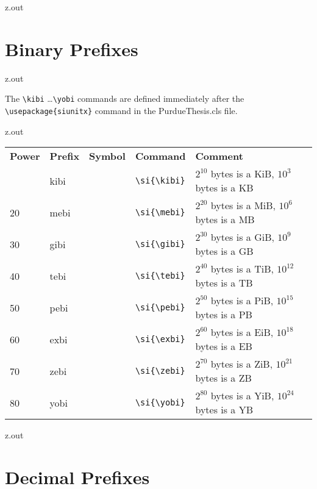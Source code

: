 \MyIO


\begin{VerbatimOut}{z.out}

\section{Binary Prefixes}
\end{VerbatimOut}

\MyIO


\begin{VerbatimOut}{z.out}

The \verb+\kibi+ \ldots \verb+\yobi+
commands are defined immediately after the \verb+\usepackage{siunitx}+ command
in the PurdueThesis.cls file.
\end{VerbatimOut}

\MyIO


\begin{VerbatimOut}{z.out}

\renewcommand{\t}[4]{\(2^{#1}\) bytes is a #2, \(10^{#3}\) bytes is a #4}
\begin{tabular}{@{}mllll@{}}
  \multicolumn{1}{l}{\bfseries Power}&
    \bfseries Prefix&
    \bfseries Symbol&
    \bfseries Command&
    \bfseries Comment\\
  \tabularspace
  10& kibi& \si{\kibi}& \verb+\si{\kibi}+& \t{10}{KiB}{3}{KB}\\
  20& mebi& \si{\mebi}& \verb+\si{\mebi}+& \t{20}{MiB}{6}{MB}\\
  30& gibi& \si{\gibi}& \verb+\si{\gibi}+& \t{30}{GiB}{9}{GB}\\
  40& tebi& \si{\tebi}& \verb+\si{\tebi}+& \t{40}{TiB}{12}{TB}\\
  50& pebi& \si{\pebi}& \verb+\si{\pebi}+& \t{50}{PiB}{15}{PB}\\
  60& exbi& \si{\exbi}& \verb+\si{\exbi}+& \t{60}{EiB}{18}{EB}\\
  70& zebi& \si{\zebi}& \verb+\si{\zebi}+& \t{70}{ZiB}{21}{ZB}\\
  80& yobi& \si{\yobi}& \verb+\si{\yobi}+& \t{80}{YiB}{24}{YB}\\
\end{tabular}
\end{VerbatimOut}

\MyIO


\begin{VerbatimOut}{z.out}

\section{Decimal Prefixes}
\end{VerbatimOut}

